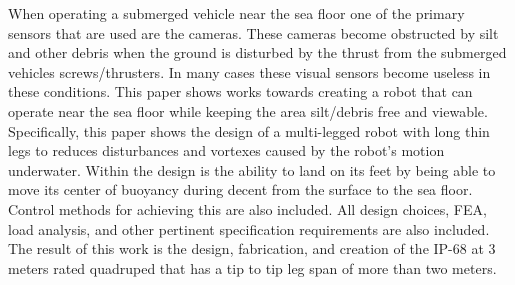 When operating a submerged vehicle near the sea floor one of the primary sensors that are used are the cameras.
These cameras become obstructed by silt and other debris when the ground is disturbed by the thrust from the submerged vehicles screws/thrusters.
In many cases these visual sensors become useless in these conditions.
This paper shows works towards creating a robot that can operate near the sea floor while keeping the area silt/debris free and viewable.
Specifically, this paper shows the design of a multi-legged robot with long thin legs to reduces disturbances and vortexes caused by the robot's motion underwater.
Within the design is the ability to land on its feet by being able to move its center of buoyancy during decent from the surface to the sea floor.
Control methods for achieving this are also included.
All design choices, FEA, load analysis, and other pertinent specification requirements are also included.
The result of this work is the design, fabrication, and creation of the IP-68 at 3 meters rated quadruped that has a tip to tip leg span of more than two meters.  